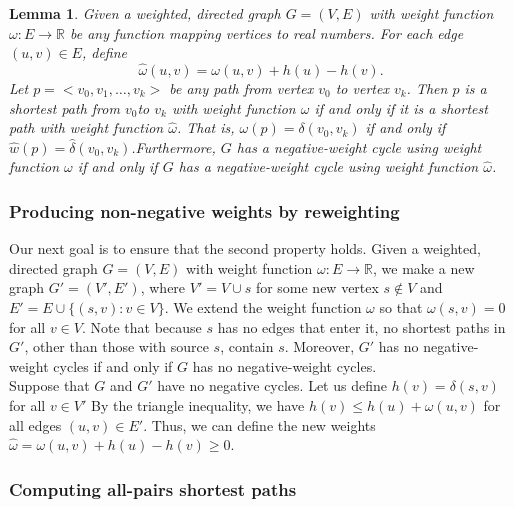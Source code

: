 \documentclass[12pt]{article}
\newtheorem{lemma}[theorem]{Lemma}
\begin{document}
\begin{lemma}
  Given a weighted, directed graph $G = (V, E)$ with weight function $\omega : E \rightarrow \mathbb{R}$ be any function mapping vertices to real numbers. For each edge $(u,v) \in E$, define
  \begin{equation*}
    \hat{\omega}(u,v) = \omega(u,v) + h(u) - h(v).
  \end{equation*}
  Let $p = <v_0, v_1, \dots, v_k>$ be any path from vertex $v_0$ to vertex $v_k$. Then $p$ is a shortest path from $v_0$to $v_k$ with weight function $\omega$ if and only if it is a shortest path with weight function $\hat{\omega}$. That is, $\omega(p) = \delta(v_0, v_k)$ if and only if $\hat{w}(p) = \hat{\delta}(v_0, v_k)$.Furthermore, $G$ has a negative-weight cycle using weight function $\omega$ if and only if $G$ has a negative-weight cycle using weight function $\hat{\omega}$.
\end{lemma}

\subsubsection*{Producing non-negative weights by reweighting}

Our next goal is to ensure that the second property holds. Given a weighted, directed graph $G = (V,E)$ with weight function $\omega : E \rightarrow \mathbb{R}$, we make a new graph $G' = (V', E')$, where $V' = V \cup {s}$ for some new vertex $s \notin V$ and $E' = E \cup \{ (s,v) : v \in V \}$. We extend the weight function $\omega$ so that $\omega(s,v) = 0$ for all $v \in V$. Note that because $s$ has no edges that enter it, no shortest paths in $G'$, other than those with source $s$, contain $s$. Moreover, $G'$ has no negative-weight cycles if and only if $G$ has no negative-weight cycles. \\

Suppose that $G$ and $G'$ have no negative cycles. Let us define $h(v) = \delta(s, v)$ for all $v \in V'$ By the triangle inequality, we have $h(v) \le h(u) + \omega(u,v)$ for all edges $(u,v) \in E'$. Thus, we can define the new weights $\hat{\omega} = \omega(u,v) + h(u) - h(v) \ge 0$.

\subsubsection*{Computing all-pairs shortest paths}
\end{document}
